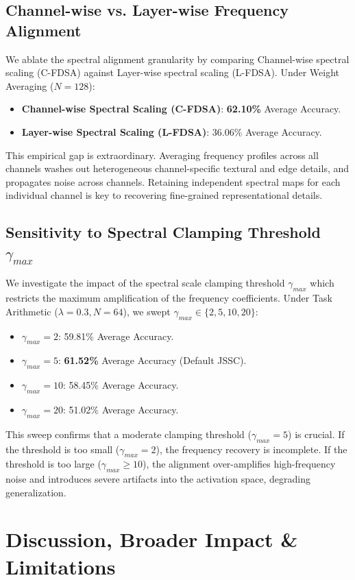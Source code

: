 \documentclass{article}
\begin{document}
\subsection{Channel-wise vs. Layer-wise Frequency Alignment}
We ablate the spectral alignment granularity by comparing Channel-wise spectral scaling (C-FDSA) against Layer-wise spectral scaling (L-FDSA). Under Weight Averaging ($N=128$):
\begin{itemize}
    \item \textbf{Channel-wise Spectral Scaling (C-FDSA)}: \textbf{62.10\%} Average Accuracy.
    \item \textbf{Layer-wise Spectral Scaling (L-FDSA)}: 36.06\% Average Accuracy.
\end{itemize}
This empirical gap is extraordinary. Averaging frequency profiles across all channels washes out heterogeneous channel-specific textural and edge details, and propagates noise across channels. Retaining independent spectral maps for each individual channel is key to recovering fine-grained representational details.

\subsection{Sensitivity to Spectral Clamping Threshold $\gamma_{max}$}
We investigate the impact of the spectral scale clamping threshold $\gamma_{max}$ which restricts the maximum amplification of the frequency coefficients. Under Task Arithmetic ($\lambda=0.3, N=64$), we swept $\gamma_{max} \in \{2, 5, 10, 20\}$:
\begin{itemize}
    \item $\gamma_{max} = 2$: 59.81\% Average Accuracy.
    \item $\gamma_{max} = 5$: \textbf{61.52\%} Average Accuracy (Default JSSC).
    \item $\gamma_{max} = 10$: 58.45\% Average Accuracy.
    \item $\gamma_{max} = 20$: 51.02\% Average Accuracy.
\end{itemize}
This sweep confirms that a moderate clamping threshold ($\gamma_{max}=5$) is crucial. If the threshold is too small ($\gamma_{max}=2$), the frequency recovery is incomplete. If the threshold is too large ($\gamma_{max} \ge 10$), the alignment over-amplifies high-frequency noise and introduces severe artifacts into the activation space, degrading generalization.

\section{Discussion, Broader Impact \& Limitations}
\label{sec:discussion}
\end{document}
